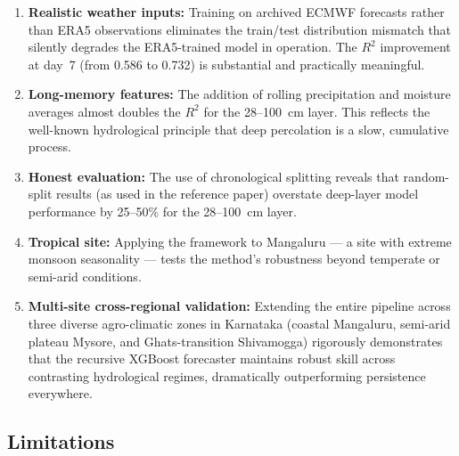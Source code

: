 \documentclass[12pt, a4paper]{article}
\begin{document}
\begin{enumerate}
    \item \textbf{Realistic weather inputs:} Training on archived ECMWF forecasts rather than ERA5 observations eliminates the train/test distribution mismatch that silently degrades the ERA5-trained model in operation. The $R^2$ improvement at day~7 (from 0.586 to 0.732) is substantial and practically meaningful.
    
    \item \textbf{Long-memory features:} The addition of rolling precipitation and moisture averages almost doubles the $R^2$ for the 28--100~cm layer. This reflects the well-known hydrological principle that deep percolation is a slow, cumulative process.
    
    \item \textbf{Honest evaluation:} The use of chronological splitting reveals that random-split results (as used in the reference paper) overstate deep-layer model performance by 25--50\% for the 28--100~cm layer.
    
    \item \textbf{Tropical site:} Applying the framework to Mangaluru --- a site with extreme monsoon seasonality --- tests the method's robustness beyond temperate or semi-arid conditions.

    \item \textbf{Multi-site cross-regional validation:} Extending the entire pipeline across three diverse agro-climatic zones in Karnataka (coastal Mangaluru, semi-arid plateau Mysore, and Ghats-transition Shivamogga) rigorously demonstrates that the recursive XGBoost forecaster maintains robust skill across contrasting hydrological regimes, dramatically outperforming persistence everywhere.
\end{enumerate}

\subsection{Limitations}
\end{document}

